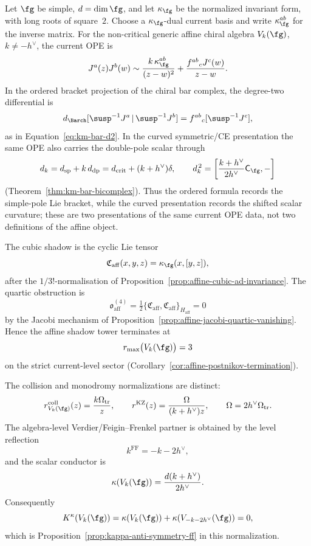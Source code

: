 \begin{proposition}
\label{prop:affine-standard-family-ledger}
Let \(\fg\) be simple, \(d=\dim\fg\), and let
\(\kappa_{\fg}\) be the normalized invariant form, with long roots of
square~\(2\).  Choose a \(\kappa_{\fg}\)-dual current basis and write
\(\kappa_{\fg}^{ab}\) for the inverse matrix.  For the non-critical
generic affine chiral algebra \(V_k(\fg)\), \(k\neq -h^\vee\), the
current OPE is
\begin{equation}\label{eq:affine-ledger-ope}
J^a(z)J^b(w)
\sim
\frac{k\,\kappa_{\fg}^{ab}}{(z-w)^2}
+
\frac{f^{ab}{}_{c}J^c(w)}{z-w}.
\end{equation}
In the ordered bracket projection of the chiral bar complex, the
degree-two differential is
\begin{equation}\label{eq:affine-ledger-bar-d2}
d_{\Barch}[\susp^{-1}J^a\,|\,\susp^{-1}J^b]
=
f^{ab}{}_{c}[\susp^{-1}J^c],
\end{equation}
as in Equation~\ref{eq:km-bar-d2}.  In the curved symmetric/CE
presentation the same OPE also carries the double-pole scalar through
\[
d_k=d_{\mathrm{sp}}+k\,d_{\mathrm{dp}}
=d_{\mathrm{crit}}+(k+h^\vee)\delta,\qquad
d_k^{\,2}=
\left[\frac{k+h^\vee}{2h^\vee}\mathsf C_{\fg},-\right]
\]
\textup{(}Theorem~\ref{thm:km-bar-bicomplex}\textup{)}.  Thus the
ordered formula records the simple-pole Lie bracket, while the
curved presentation records the shifted scalar curvature; these are
two presentations of the same current OPE data, not two definitions
of the affine object.

The cubic shadow is the cyclic Lie tensor
\[
\mathfrak C_{\mathrm{aff}}(x,y,z)
=\kappa_{\fg}(x,[y,z]),
\]
after the \(1/3!\)-normalisation of
Proposition~\ref{prop:affine-cubic-ad-invariance}.  The quartic
obstruction is
\[
\mathfrak o^{(4)}_{\mathrm{aff}}
=\tfrac12\{\mathfrak C_{\mathrm{aff}},
\mathfrak C_{\mathrm{aff}}\}_{H_{\mathrm{aff}}}=0
\]
by the Jacobi mechanism of
Proposition~\ref{prop:affine-jacobi-quartic-vanishing}.  Hence the
affine shadow tower terminates at
\[
r_{\max}\bigl(V_k(\fg)\bigr)=3
\]
on the strict current-level sector
\textup{(}Corollary~\ref{cor:affine-postnikov-termination}\textup{)}.

The collision and monodromy normalizations are distinct:
\begin{equation}\label{eq:affine-ledger-r-data}
r^{\mathrm{coll}}_{V_k(\fg)}(z)
=\frac{k\Omega_{\mathrm{tr}}}{z},
\qquad
r^{\mathrm{KZ}}(z)
=\frac{\Omega}{(k+h^\vee)z},
\qquad
\Omega=2h^\vee\Omega_{\mathrm{tr}} .
\end{equation}
The algebra-level Verdier/Feigin--Frenkel partner is obtained by the
level reflection
\[
k^{\mathrm{FF}}=-k-2h^\vee ,
\]
and the scalar conductor is
\[
\kappa(V_k(\fg))=\frac{d(k+h^\vee)}{2h^\vee}.
\]
Consequently
\begin{equation}\label{eq:affine-ledger-kappa-sum}
K^\kappa(V_k(\fg))
=\kappa(V_k(\fg))+\kappa(V_{-k-2h^\vee}(\fg))=0,
\end{equation}
which is Proposition~\ref{prop:kappa-anti-symmetry-ff} in this
normalization.


\end{proposition}
